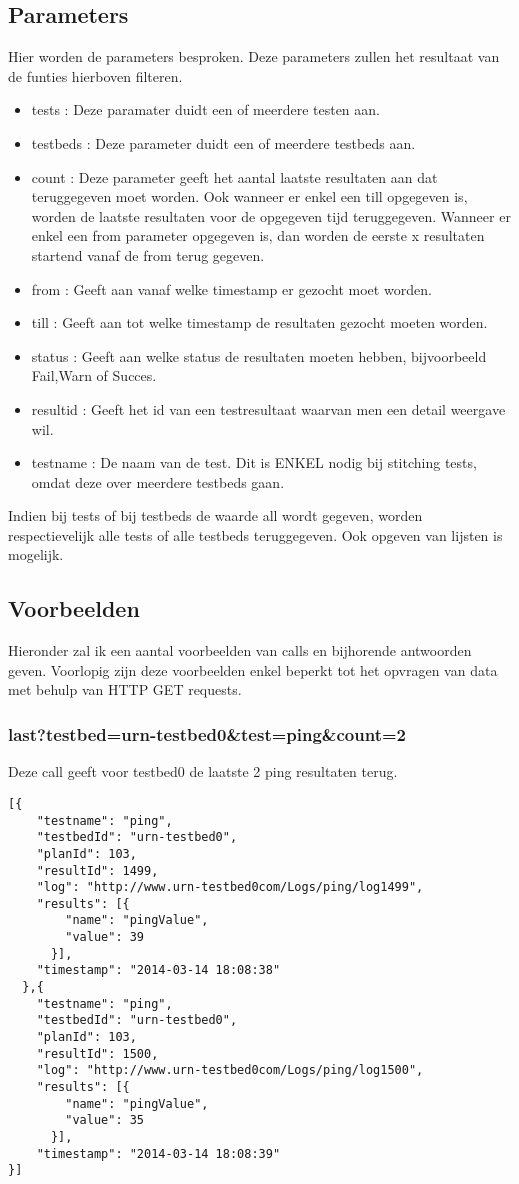 \documentclass[11pt]{article}
\begin{document}
\subsection{Parameters}
Hier worden de parameters besproken. Deze parameters zullen het resultaat van de funties hierboven filteren.

\begin{itemize}
\item tests : Deze paramater duidt een of meerdere testen aan.
\item testbeds : Deze parameter duidt een of meerdere testbeds aan.
\item count : Deze parameter geeft het aantal laatste resultaten aan dat teruggegeven moet worden. 
Ook wanneer er enkel een till opgegeven is, worden de laatste resultaten voor de opgegeven tijd teruggegeven.
Wanneer er enkel een from parameter opgegeven is, dan worden de eerste x resultaten startend vanaf de from terug gegeven.
\item from : Geeft aan vanaf welke timestamp er gezocht moet worden.
\item till : Geeft aan tot welke timestamp de resultaten gezocht moeten worden.
\item status : Geeft aan welke status de resultaten moeten hebben, bijvoorbeeld Fail,Warn of Succes.
\item resultid : Geeft het id van een testresultaat waarvan men een detail weergave wil.
\item testname : De naam van de test. Dit is ENKEL nodig bij stitching tests, omdat deze over meerdere testbeds gaan. 
\end{itemize}
Indien bij tests of bij testbeds de waarde all wordt gegeven, worden respectievelijk alle tests of alle testbeds teruggegeven. Ook opgeven van lijsten is mogelijk.
\clearpage
\subsection{Voorbeelden}
Hieronder zal ik een aantal voorbeelden van calls en bijhorende antwoorden geven.
Voorlopig zijn deze voorbeelden enkel beperkt tot het opvragen van data met behulp van HTTP GET requests.
\subsubsection{last?testbed=urn-testbed0\&test=ping\&count=2}
Deze call geeft voor testbed0 de laatste 2 ping resultaten terug.
\begin{verbatim}
[{
    "testname": "ping",
    "testbedId": "urn-testbed0",
    "planId": 103,
    "resultId": 1499,
    "log": "http://www.urn-testbed0com/Logs/ping/log1499",
    "results": [{
        "name": "pingValue",
        "value": 39
      }],
    "timestamp": "2014-03-14 18:08:38"
  },{
    "testname": "ping",
    "testbedId": "urn-testbed0",
    "planId": 103,
    "resultId": 1500,
    "log": "http://www.urn-testbed0com/Logs/ping/log1500",
    "results": [{
        "name": "pingValue",
        "value": 35
      }],
    "timestamp": "2014-03-14 18:08:39"
}]
\end{verbatim}
\clearpage
\end{document}
